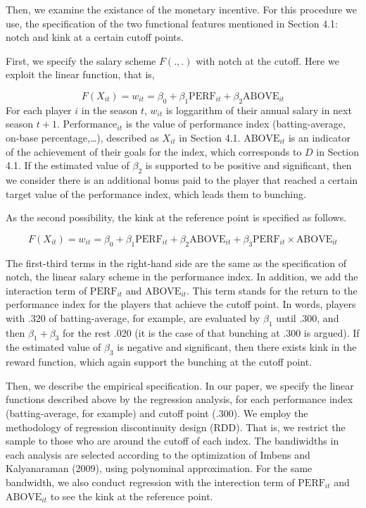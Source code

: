 \documentclass[dvipdfmx, 12pt]{article}
\begin{document}
  Then, we examine the existance of the monetary incentive. For this procedure we use, the specification of the two functional features mentioned in Section 4.1: notch and kink at a certain cutoff points.

  First, we specify the salary scheme $F(.,.)$ with notch at the cutoff. Here we exploit the linear function, that is,

  \[
  F(X_{it}) = w_{it} = \beta_0 + \beta_1 \text{PERF}_{it} + \beta_2 \text{ABOVE}_{it}
  \]
  For each player $i$ in the season $t$, $w_{it}$ is loggarithm of their annual salary in next season $t+1$. $\text{Performance}_{it}$ is the value of performance index (batting-average, on-base percentage,\ldots), described as $X_{it}$ in Section 4.1. $\text{ABOVE}_{it}$ is an indicator of the achievement of their goals for the index, which corresponds to $D$ in Section 4.1. If the estimated value of $\beta_2$ is supported to be positive and significant, then we consider there is an additional bonus paid to the player that reached a certain target value of the performance index, which leads them to bunching.

  As the second possibility, the kink at the reference point is specified as follows.

  \[
  F(X_{it}) = w_{it} = \beta_0 + \beta_1 \text{PERF}_{it} + \beta_2 \text{ABOVE}_{it} + \beta_3 \text{PERF}_{it} \times \text{ABOVE}_{it}
  \]

  The first-third terms in the right-hand side are the same as the specification of notch, the linear salary scheme in the performance index. In addition, we add the interaction term of $\text{PERF}_{it}$ and $\text{ABOVE}_{it}$. This term stands for the return to the performance index for the players that achieve the cutoff point. In words, players with .320 of batting-average, for example, are evaluated by $\beta_1$ until .300, and then $\beta_1 + \beta_3$ for the rest .020 (it is the case of that bunching at .300 is argued). If the estimated value of $\beta_3$ is negative and significant, then there exists kink in the reward function, which again support the bunching at the cutoff point.

  Then, we describe the empirical specification. In our paper, we specify the linear functions described above by the regression analysis, for each performance index (batting-average, for example) and cutoff point (.300). We employ the methodology of regression discontinuity design (RDD). That is, we restrict the sample to those who are around the cutoff of each index. The bandiwidths in each analysis are selected according to the optimization of Imbens and Kalyanaraman (2009), using polynominal approximation. For the same bandwidth, we also conduct regression with the interection term of $\text{PERF}_{it}$ and $\text{ABOVE}_{it}$ to see the kink at the reference point.
\end{document}
